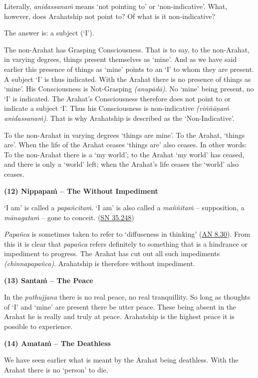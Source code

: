 Literally, \emph{anidassanaṁ} means `not pointing to' or `non-indicative'. What, however, does Arahatship not point to? Of what is it non-indicative?

The answer is: a subject (`I').

The non-Arahat has Grasping Consciousness. That is to say, to the non-Arahat, in varying degrees, things present themselves as `mine'. And as we have said earlier this presence of things as `mine' points to an `I' to whom they are present. A subject `I' is thus indicated. With the Arahat there is no presence of things as `mine'. His Consciousness is Not-Grasping \emph{(anupādā)}. No `mine' being present, no `I' is indicated. The Arahat's Consciousness therefore does not point to or indicate a subject `I'. Thus his Consciousness is non-indicative \emph{(viññāṇaṁ anidassanaṁ)}. That is why Arahatship is described as the `Non-Indicative'.

To the non-Arahat in varying degrees `things are mine'. To the Arahat, `things are'. When the life of the Arahat ceases `things are' also ceases. In other words: To the non-Arahat there is a `my world'; to the Arahat `my world' has ceased, and there is only a `world' left; when the Arahat's life ceases the `world' also ceases.

\textbf{(12) Nippapaṁ -- The Without Impediment}

`I am' is called a \emph{papañcitaṁ}. `I am' is also called a \emph{maññitaṁ} -- supposition, a \emph{mānagataṁ} -- gone to conceit. (\href{https://suttacentral.net/sn35.248/en/bodhi}{SN 35.248})

\emph{Papañca} is sometimes taken to refer to `diffuseness in thinking' (\href{https://suttacentral.net/an8.30/en/bodhi}{AN 8.30}). From this it is clear that \emph{papañca} refers definitely to something that is a hindrance or impediment to progress. The Arahat has cut out all such impediments \emph{(chinnapapañca)}. Arahatship is therefore without impediment.

\textbf{(13) Santaṁ -- The Peace}

In the \emph{puthujjana} there is no real peace, no real tranquillity. So long as thoughts of `I' and `mine' are present there  be utter peace. These being absent in the Arahat he is really and truly at peace. Arahatship is the highest peace it is possible to experience.

\textbf{(14) Amataṁ -- The Deathless}

We have seen earlier what is meant by the Arahat being deathless. With the Arahat there is no `person' to die.

